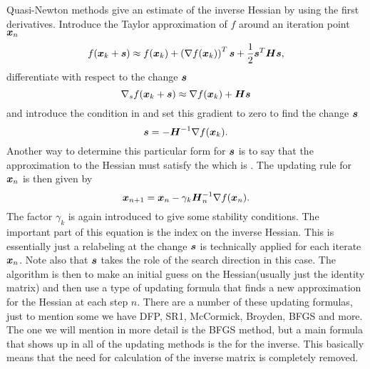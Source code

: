     Quasi-Newton methods give an estimate of the inverse Hessian by using the
    first derivatives. Introduce the Taylor approximation of $f$ around an
    iteration point $\boldsymbol{{x}}_n$
        \begin{equation}
            f(\boldsymbol{{x}}_k + \boldsymbol{{s}}) \approx f(\boldsymbol{{x}}_k) + \left(\nabla
            f(\boldsymbol{{x}}_k)\right)^T\boldsymbol{{s}} + \frac{1}{2}\boldsymbol{{s}}^T \boldsymbol{{H}}
            \boldsymbol{{s}},
        \end{equation}
    differentiate with respect to the change $\boldsymbol{{s}}$
        \begin{equation}
            \nabla_s f(\boldsymbol{{x}}_k + \boldsymbol{{s}}) \approx \nabla f(\boldsymbol{{x}}_k) +
            \boldsymbol{{H}}\boldsymbol{{s}}
            \label{eq:secantEquationNewton}
        \end{equation}
    and introduce the condition in  and set this
    gradient to zero to find the change $\boldsymbol{{s}}$
        \begin{equation}
            \boldsymbol{{s}} = -\boldsymbol{{H}}^{-1} \nabla f(\boldsymbol{{x}}_k).
        \end{equation}
    Another way to determine this particular form for $\boldsymbol{{s}}$ is to say that
    the approximation to the Hessian must satisfy the 
    which is . The updating rule for $\boldsymbol{{x}}_n$
    is then given by
        \begin{equation}
            \boldsymbol{{x}}_{n+1} = \boldsymbol{{x}}_n - \gamma_k\boldsymbol{{H}}^{-1}_n\nabla
            f(\boldsymbol{{x}}_n).
        \end{equation}
    The factor $\gamma_k$ is again introduced to give some stability
    conditions. The important part of this equation is the index on the inverse
    Hessian. This is essentially just a relabeling at the change $\boldsymbol{{s}}$ is
    technically applied for each iterate $\boldsymbol{{x}}_n$. Note also that
    $\boldsymbol{{s}}$ takes the role of the search direction in this case. The
    algorithm is then to make an initial guess on the Hessian(usually just the
    identity matrix) and then use a type of updating formula that finds a new
    approximation for the Hessian at each step $n$. There are a number of these
    updating formulas, just to mention some we have DFP, SR1, McCormick,
    Broyden, BFGS and more. The one we will mention in more detail is the BFGS
    method, but a main formula that shows up in all of the updating methods is
    the  for the inverse. This basically means
    that the need for calculation of the inverse matrix is completely removed.
    \\

